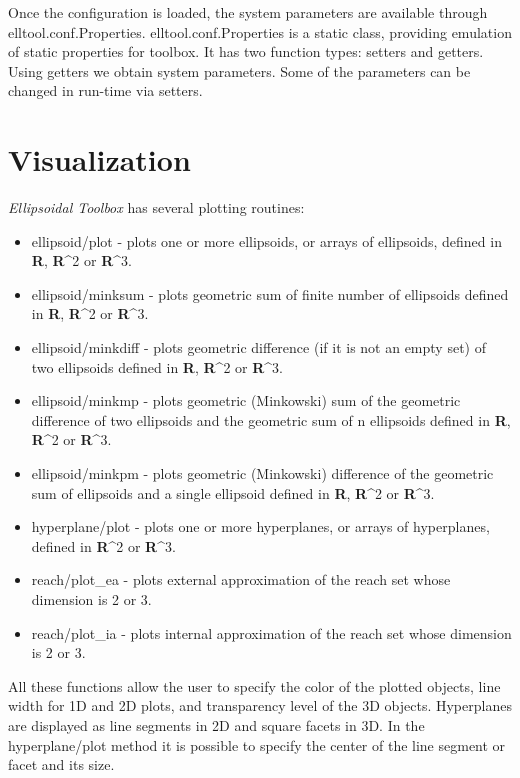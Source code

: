 \documentclass[letterpaper,10pt,english]{sphinxmanual}
\begin{document}
Once the configuration is loaded, the system parameters are available
through elltool.conf.Properties. elltool.conf.Properties is a static
class, providing emulation of static properties for toolbox. It has two
function types: setters and getters. Using getters we obtain system
parameters. Some of the parameters can be changed in run-time via
setters.


\section{Visualization}
\label{chap_implement:visualization}
\emph{Ellipsoidal Toolbox} has several plotting routines:
\begin{itemize}
\item {} 
ellipsoid/plot - plots one or more ellipsoids, or arrays of
ellipsoids, defined in {\bf R}, {\bf R}^2 or
{\bf R}^3.

\item {} 
ellipsoid/minksum - plots geometric sum of finite number of
ellipsoids defined in {\bf R}, {\bf R}^2 or
{\bf R}^3.

\item {} 
ellipsoid/minkdiff - plots geometric difference (if it is not an
empty set) of two ellipsoids defined in {\bf R},
{\bf R}^2 or {\bf R}^3.

\item {} 
ellipsoid/minkmp - plots geometric (Minkowski) sum of the geometric
difference of two ellipsoids and the geometric sum of n
ellipsoids defined in {\bf R}, {\bf R}^2 or
{\bf R}^3.

\item {} 
ellipsoid/minkpm - plots geometric (Minkowski) difference of the
geometric sum of ellipsoids and a single ellipsoid defined in
{\bf R}, {\bf R}^2 or {\bf R}^3.

\item {} 
hyperplane/plot - plots one or more hyperplanes, or arrays of
hyperplanes, defined in {\bf R}^2 or {\bf R}^3.

\item {} 
reach/plot\_ea - plots external approximation of the reach set whose
dimension is 2 or 3.

\item {} 
reach/plot\_ia - plots internal approximation of the reach set whose
dimension is 2 or 3.

\end{itemize}

All these functions allow the user to specify the color of the plotted
objects, line width for 1D and 2D plots, and transparency level of the
3D objects. Hyperplanes are displayed as line segments in 2D and square
facets in 3D. In the hyperplane/plot method it is possible to specify
the center of the line segment or facet and its size.
\end{document}
